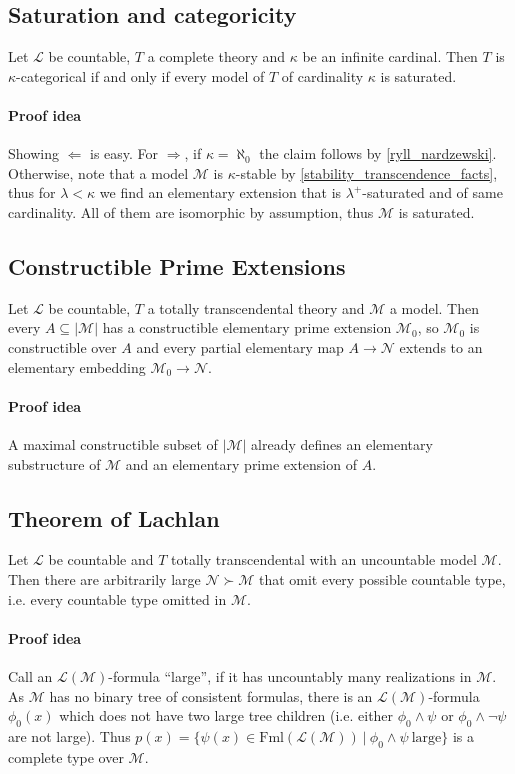 \documentclass{scrartcl}
\begin{document}
\subsection{Saturation and categoricity}
\label{uncountable_saturation_categoricity}
Let $\mathcal{L}$ be countable, $T$ a complete theory and $\kappa$ be an infinite cardinal. 
Then $T$ is $\kappa$-categorical if and only if every model of $T$ of cardinality $\kappa$ is saturated. 
\paragraph{Proof idea} Showing $\Leftarrow$ is easy. For $\Rightarrow$, if $\kappa = \aleph_0$ the claim follows by \ref{ryll_nardzewski}.
Otherwise, note that a model $\mathcal{M}$ is $\kappa$-stable by \ref{stability_transcendence_facts}, thus for $\lambda < \kappa$ we find an elementary extension that is $\lambda^+$-saturated and of same cardinality.
All of them are isomorphic by assumption, thus $\mathcal{M}$ is saturated.

\subsection{Constructible Prime Extensions}
\label{constructible_prime_extensions}
Let $\mathcal{L}$ be countable, $T$ a totally transcendental theory and $\mathcal{M}$ a model.
Then every $A \subseteq |\mathcal{M}|$ has a constructible elementary prime extension $\mathcal{M}_0$, so $\mathcal{M}_0$ is constructible over $A$ and every partial elementary map $A \to \mathcal{N}$ extends to an elementary embedding $\mathcal{M}_0 \to \mathcal{N}$.
\paragraph{Proof idea} A maximal constructible subset of $|\mathcal{M}|$ already defines an elementary substructure of $\mathcal{M}$ and an elementary prime extension of $A$.

\subsection{Theorem of Lachlan}
\label{lachlan_theorem}
Let $\mathcal{L}$ be countable and $T$ totally transcendental with an uncountable model $\mathcal{M}$.
Then there are arbitrarily large $\mathcal{N} \succ \mathcal{M}$ that omit every possible countable type, i.e. every countable type omitted in $\mathcal{M}$.

\paragraph{Proof idea} Call an $\mathcal{L}(\mathcal{M})$-formula ``large'', if it has uncountably many realizations in $\mathcal{M}$.
As $\mathcal{M}$ has no binary tree of consistent formulas, there is an $\mathcal{L}(\mathcal{M})$-formula $\phi_0(x)$ which does not have two large tree children (i.e. either $\phi_0 \wedge \psi$ or $\phi_0 \wedge \neg\psi$ are not large).
Thus $p(x) = \{ \psi(x) \in \mathrm{Fml}(\mathcal{L}(\mathcal{M})) \ | \ \phi_0 \wedge \psi \ \text{large} \}$ is a complete type over $\mathcal{M}$.
\end{document}
